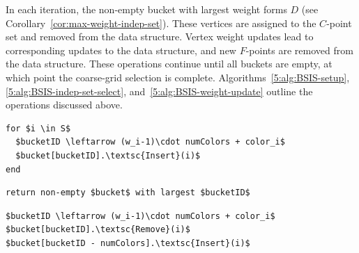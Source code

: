 \documentclass{elsart}
\begin{document}
In each iteration, the non-empty bucket with largest weight forms $D$
(see Corollary~\ref{cor:max-weight-indep-set}). These vertices are
assigned to the $C$-point set and removed from the data
structure. Vertex weight updates lead to corresponding updates to the
data structure, and new $F$-points are removed from the data
structure. These operations continue until all buckets are empty, at
which point the coarse-grid selection is
complete. Algorithms~\ref{5:alg:BSIS-setup},
\ref{5:alg:BSIS-indep-set-select}, and~\ref{5:alg:BSIS-weight-update}
outline the operations discussed above.
\begin{lstlisting}[caption={BSIS Data Structure Setup},label=5:alg:BSIS-setup]
%\textsc{BSIS-Setup}$(S)$%
for $i \in S$
  $bucketID \leftarrow (w_i-1)\cdot numColors + color_i$
  $bucket[bucketID].\textsc{Insert}(i)$
end
\end{lstlisting}
\begin{lstlisting}[caption={Independent Set Selection},label=5:alg:BSIS-indep-set-select]
%\textsc{BSIS-Independent-Set-Selection}$(S)$%
return non-empty $bucket$ with largest $bucketID$
\end{lstlisting}
\begin{lstlisting}[caption={BSIS Weight Update},label=5:alg:BSIS-weight-update]
%\textsc{BSIS-Weight-Update}$(S,\, i)$%
$bucketID \leftarrow (w_i-1)\cdot numColors + color_i$
$bucket[bucketID].\textsc{Remove}(i)$
$bucket[bucketID - numColors].\textsc{Insert}(i)$
\end{lstlisting}
\end{document}
